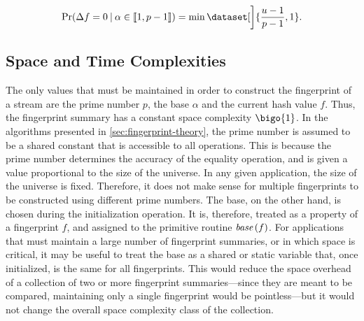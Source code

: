 \begin{equation}
  \label{eq:fingerprint-analysis-accuracy-false-positive}
  \probability (\Delta f = 0 \givensymbol \alpha \in \dataintegerinterval{1, p - 1}) = \min \dataset[\bigg]{\frac{u - 1}{p - 1}, 1}.
\end{equation}

\subsection{Space and Time Complexities}
\label{subsec:fingerprint-analysis-complexity}

The only values that must be maintained in order to construct the fingerprint of a stream are the prime number \( p \), the base \( \alpha \) and the current hash value \( f \).
Thus, the fingerprint summary has a constant space complexity \( \bigo{1} \).
In the algorithms presented in \cref{sec:fingerprint-theory}, the prime number is assumed to be a shared constant that is accessible to all operations.
This is because the prime number determines the accuracy of the equality operation, and is given a value proportional to the size of the universe.
In any given application, the size of the universe is fixed.
Therefore, it does not make sense for multiple fingerprints to be constructed using different prime numbers.
The base, on the other hand, is chosen during the initialization operation.
It is, therefore, treated as a property of a fingerprint \( f \), and assigned to the primitive routine \( \base (f) \).
For applications that must maintain a large number of fingerprint summaries, or in which space is critical, it may be useful to treat the base as a shared or static variable that, once initialized, is the same for all fingerprints.
This would reduce the space overhead of a collection of two or more fingerprint summaries---since they are meant to be compared, maintaining only a single fingerprint would be pointless---but it would not change the overall space complexity class of the collection.

